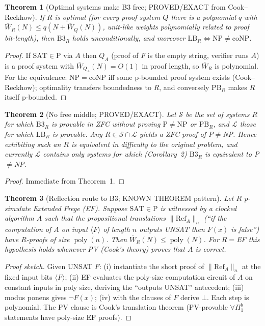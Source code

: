 \documentclass[11pt]{article}
\newtheorem{theorem}{Theorem}
\theoremstyle{definition}
\newcommand{\Wbar}{\overline W}
\newcommand{\SAT}{\mathrm{SAT}}
\newcommand{\poly}{\operatorname{poly}}
\begin{document}
\begin{theorem}[Optimal systems make B3 free; PROVED/EXACT from Cook--Reckhow]
If $R$ is optimal (for every proof system $Q$ there is a polynomial $q$ with
$\Wbar_R(N)\le q(N+\Wbar_Q(N))$, unit-like weights polynomially related to
proof bit-length), then $\mathrm{B3}_R$ holds unconditionally, and moreover
$\mathrm{LB}_R\iff \mathrm{NP}\neq\mathrm{coNP}$.
\end{theorem}
\begin{proof}
If $\SAT\in\mathrm P$ via $A$ then $Q_A$ (proof of $F$ is the empty string,
verifier runs $A$) is a proof system with $\Wbar_{Q_A}(N)=O(1)$ in proof length,
so $\Wbar_R$ is polynomial. For the equivalence: NP$=$coNP iff some
p-bounded proof system exists (Cook--Reckhow); optimality transfers boundedness
to $R$, and conversely $\mathrm{PB}_R$ makes $R$ itself p-bounded.
\end{proof}

\begin{theorem}[No free middle; PROVED/EXACT]
Let $\mathcal S$ be the set of systems $R$ for which $\mathrm{B3}_R$ is provable
in ZFC \emph{without} proving $\mathrm{P}\ne\mathrm{NP}$ or $\mathrm{PB}_R$,
and $\mathcal L$ those for which $\mathrm{LB}_R$ is provable. Any $R\in\mathcal
S\cap\mathcal L$ yields a ZFC proof of P$\neq$NP. Hence exhibiting such an $R$
is equivalent in difficulty to the original problem, and currently
$\mathcal L$ contains only systems for which (Corollary~2) $\mathrm{B3}_R$
is equivalent to P$\neq$NP.
\end{theorem}
\begin{proof}Immediate from Theorem~1.\end{proof}

\begin{theorem}[Reflection route to B3; KNOWN THEOREM pattern]
Let $R$ p-simulate Extended Frege (EF). Suppose $\SAT\in\mathrm P$ is
witnessed by a clocked algorithm $A$ such that the propositional translations
$\|\mathrm{Ref}_A\|_n$ (``if the computation of $A$ on input $\langle F\rangle$
of length $n$ outputs UNSAT then $F(x)$ is false'') have $R$-proofs of size
$\poly(n)$. Then $\Wbar_R(N)\le\poly(N)$. For $R=$EF this hypothesis holds
whenever PV (Cook's theory) proves that $A$ is correct.
\end{theorem}
\begin{proof}[Proof sketch]
Given UNSAT $F$: (i) instantiate the short proof of $\|\mathrm{Ref}_A\|_n$ at
the fixed input bits $\langle F\rangle$; (ii) EF evaluates the poly-size
computation circuit of $A$ on constant inputs in poly size, deriving the
``outputs UNSAT'' antecedent; (iii) modus ponens gives $\neg F(x)$; (iv) with
the clauses of $F$ derive $\bot$. Each step is polynomial. The PV clause is
Cook's translation theorem (PV-provable $\forall\Pi^b_1$ statements have
poly-size EF proofs).
\end{proof}
\end{document}
